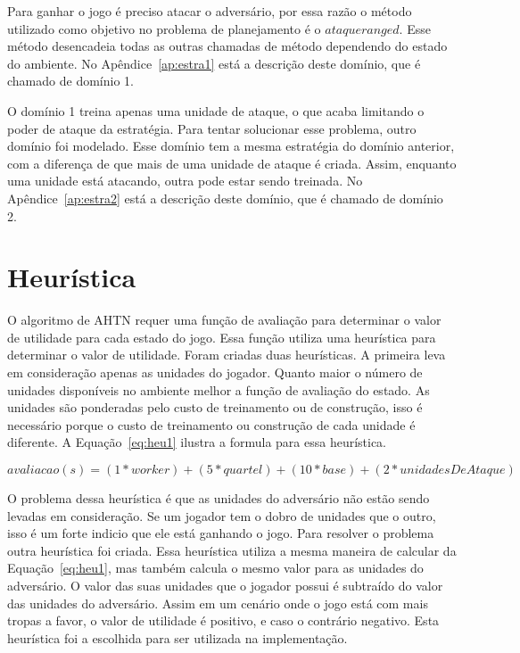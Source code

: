 Para ganhar o jogo é preciso atacar o adversário, por essa razão o método utilizado como objetivo no problema de planejamento é o $ataqueranged$.
Esse método desencadeia todas as outras chamadas de método dependendo do estado do ambiente.
No Apêndice~\ref{ap:estra1} está a descrição deste domínio, que é chamado de domínio 1.

O domínio 1 treina apenas uma unidade de ataque, o que acaba limitando o poder de ataque da estratégia.
Para tentar solucionar esse problema, outro domínio foi modelado.
Esse domínio tem a mesma estratégia do domínio anterior, com a diferença de que mais de uma unidade de ataque é criada.
Assim, enquanto uma unidade está atacando, outra pode estar sendo treinada.
No Apêndice~\ref{ap:estra2} está a descrição deste domínio, que é chamado de domínio 2.


\section{Heurística}

O algoritmo de AHTN requer uma função de avaliação para determinar o valor de utilidade para cada estado do jogo. Essa função utiliza uma heurística para determinar o valor de utilidade.
Foram criadas duas heurísticas.
A primeira leva em consideração apenas as unidades do jogador.
Quanto maior o número de unidades disponíveis no ambiente melhor a função de avaliação do estado.
As unidades são ponderadas pelo custo de treinamento ou de construção, isso é necessário porque o custo de treinamento ou construção de cada unidade é diferente.
A Equação~\ref{eq:heu1} ilustra a formula para essa heurística.

\begin{equation}
\label{eq:heu1}	
avaliacao(s) =  (1*worker) + (5 * quartel) + (10 * base) + (2 * unidadesDeAtaque)
\end{equation}

O problema dessa heurística é que as unidades do adversário não estão sendo levadas em consideração.
Se um jogador tem o dobro de unidades que o outro, isso é um forte indicio que ele está ganhando o jogo.
Para resolver o problema outra heurística foi criada.
Essa heurística utiliza a mesma maneira de calcular da Equação~\ref{eq:heu1}, mas também calcula o mesmo valor para as unidades do adversário. 
O valor das suas unidades que o jogador possui é subtraído do valor das unidades do adversário. 
Assim em um cenário onde o jogo está com mais tropas a favor, o valor de utilidade é positivo, e caso o contrário negativo.
Esta heurística foi a escolhida para ser utilizada na implementação.

